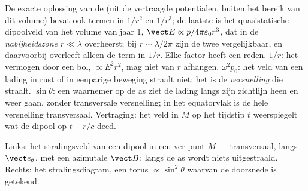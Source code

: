 \begin{remark}\label{rem:b2:dipole-radiation:reading}
De exacte oplossing van de  (uit de vertraagde
potentialen, buiten het bereik van dit volume) bevat ook termen in $1/r^2$
en $1/r^3$; de laatste is het quasistatische dipoolveld van het volume van
jaar 1, $\vect E \propto p/4\pi\varepsilon_0r^3$, dat in de
\emph{nabijheidszone} $r \ll \lambda$ overheerst; bij $r \sim \lambda/2\pi$
zijn de twee vergelijkbaar, en daarvoorbij overleeft alleen de term in
$1/r$. Elke factor heeft een reden. $1/r$: het vermogen door een bol,
$\propto E^2r^2$, mag niet van $r$ afhangen. $\omega^2p_0$: het veld van een
lading in rust of in eenparige beweging straalt niet; het is de
\emph{versnelling} die straalt. $\sin\theta$: een waarnemer op de as ziet de
lading langs zijn zichtlijn heen en weer gaan, zonder transversale
versnelling; in het equatorvlak is de hele versnelling transversaal.
Vertraging: het veld in $M$ op het tijdstip $t$ weerspiegelt wat de dipool
op $t - r/c$ deed.
\end{remark}

\begin{omfigure}

{\small Links: het stralingsveld van een dipool in een ver punt $M$ ---
transversaal, langs $\vect e_\theta$, met een azimutale $\vect B$; langs de
as wordt niets uitgestraald. Rechts: het stralingsdiagram, een torus
$\propto\sin^2\theta$ waarvan de doorsnede is getekend.}
\end{omfigure}

